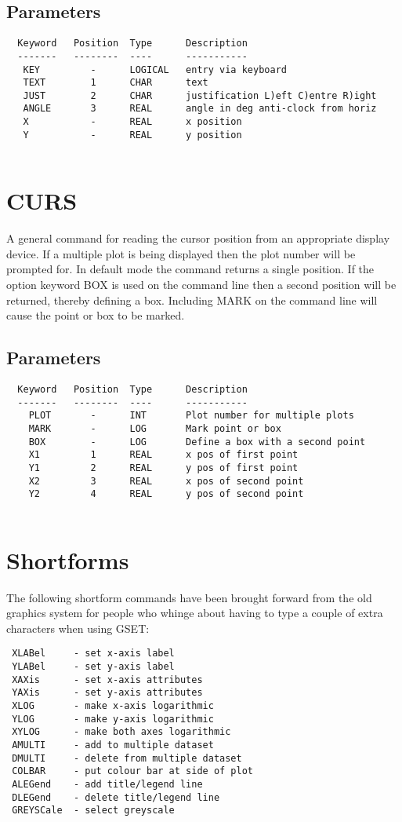 \documentclass{book}
\renewcommand{\_}{{\tt\char'137}}     %
\begin{document}
\subsection{Parameters}
\begin{verbatim}
  Keyword   Position  Type      Description
  -------   --------  ----      -----------
   KEY         -      LOGICAL   entry via keyboard
   TEXT        1      CHAR      text
   JUST        2      CHAR      justification L)eft C)entre R)ight
   ANGLE       3      REAL      angle in deg anti-clock from horiz
   X           -      REAL      x position
   Y           -      REAL      y position
 
\end{verbatim}\section{CURS}
A general command for reading the cursor position from an appropriate
display device. If a multiple plot is being displayed then the plot
number will be prompted for. In default mode the command returns a
single position. If the option keyword BOX is used on the command
line then a second position will be returned, thereby defining a box.
Including MARK on the command line will cause the point or box to be
marked.
 
\subsection{Parameters}
\begin{verbatim}
  Keyword   Position  Type      Description
  -------   --------  ----      -----------
    PLOT       -      INT       Plot number for multiple plots
    MARK       -      LOG       Mark point or box
    BOX        -      LOG       Define a box with a second point
    X1         1      REAL      x pos of first point
    Y1         2      REAL      y pos of first point
    X2         3      REAL      x pos of second point
    Y2         4      REAL      y pos of second point
 
\end{verbatim}\section{Shortforms}
The following shortform commands have been brought forward from the
old graphics system for people who whinge about having to type a
couple of extra characters when using GSET:
\begin{verbatim}
 XLABel     - set x-axis label
 YLABel     - set y-axis label
 XAXis      - set x-axis attributes
 YAXis      - set y-axis attributes
 XLOG       - make x-axis logarithmic
 YLOG       - make y-axis logarithmic
 XYLOG      - make both axes logarithmic
 AMULTI     - add to multiple dataset
 DMULTI     - delete from multiple dataset
 COLBAR     - put colour bar at side of plot
 ALEGend    - add title/legend line
 DLEGend    - delete title/legend line
 GREYSCale  - select greyscale
\end{verbatim}
\end{document}

